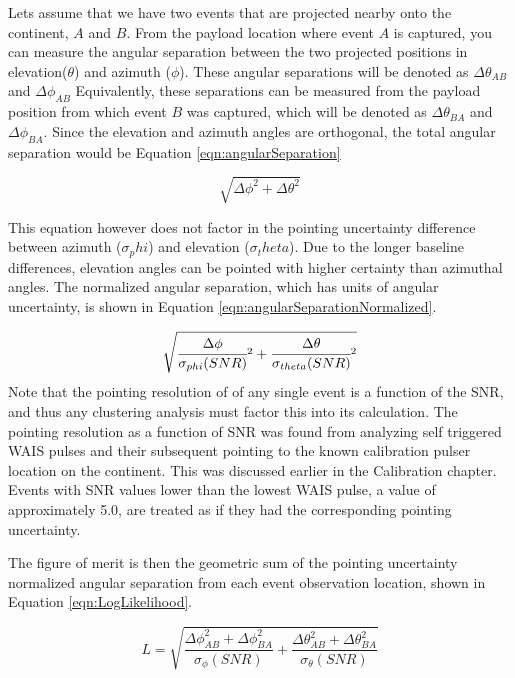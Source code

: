 		
		Lets assume that we have two events that are projected nearby onto the continent, $A$ and $B$.  From the payload location where event $A$ is captured, you can measure the angular separation between the two projected positions in elevation($\theta$) and azimuth ($\phi$).  These angular separations will be denoted as $\Delta\theta_{AB}$ and $\Delta\phi_{AB}$  Equivalently, these separations can be measured from the payload position from which event $B$ was captured, which will be denoted as $\Delta\theta_{BA}$ and $\Delta\phi_{BA}$.  Since the elevation and azimuth angles are orthogonal, the total angular separation would be Equation \ref{eqn:angularSeparation}
		
	\begin{equation}
		\sqrt{\Delta\phi^2 + \Delta\theta^2}
		\label{eqn:angularSeparation}
	\end{equation}
	
	This equation however does not factor in the pointing uncertainty difference between azimuth ($\sigma_phi$) and elevation ($\sigma_theta$). Due to the longer baseline differences, elevation angles can be pointed with higher certainty than azimuthal angles.  The normalized angular separation, which has units of angular uncertainty, is shown in Equation \ref{eqn:angularSeparationNormalized}.
	
	\begin{equation}
		\sqrt{\cfrac{\Delta\phi}{\sigma_{phi}(SNR)}^2 + \cfrac{\Delta\theta}{\sigma_{theta}(SNR)}^2}
		\label{eqn:angularSeparationNormalized}
	\end{equation}
		Note that the pointing resolution  of of any single event is a function of the SNR, and thus any clustering analysis must factor this into its calculation.  The pointing resolution as a function of SNR was found from analyzing self triggered WAIS pulses and their subsequent pointing to the known calibration pulser location on the continent.  This was discussed earlier in the Calibration chapter.  Events with SNR values lower than the lowest WAIS pulse, a value of approximately 5.0, are treated as if they had the corresponding pointing uncertainty.
		
		The figure of merit is then the geometric sum of the pointing uncertainty normalized angular separation from each event observation location, shown in Equation \ref{eqn:LogLikelihood}.
		
	\begin{equation}
		L = \sqrt{\frac{\Delta\phi_{AB}^2   + \Delta\phi_{BA}^2}{\sigma_{\phi}(SNR)} + \frac{\Delta\theta_{AB}^2 + \Delta\theta_{BA}^2}{\sigma_{\theta}(SNR)}}
		\label{eqn:LogLikelihood}
	\end{equation}


